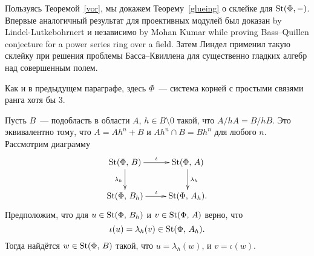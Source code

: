 \documentclass[oneside, 11pt]{amsart} \pdfoutput=1
\begin{document}
Пользуясь Теоремой~\ref{vor}, мы докажем Теорему~\ref{glueing} о склейке для $\mathop{\mathrm{St}}\nolimits(\Phi,-)$. Впервые аналогичный результат для проективных модулей был доказан by Lindel-Lutkebohrnert и независимо by Mohan Kumar while proving Bass--Quillen conjecture for a power series ring over a field. Затем Линдел применил такую склейку при решения проблемы Басса--Квиллена для существенно гладких алгебр над совершенным полем.

Как и в предыдущем параграфе, здесь $\Phi$~--- система корней с простыми связями ранга хотя бы 3.

\begin{theorem}
\label{glueing}
Пусть $B$~--- подобласть в области $A$, $h\in B\setminus0$ такой, что $A / hA = B / hB$. Это эквивалентно тому, что $A = Ah^n + B$ и $Ah^n \cap B = Bh^n$ для любого $n$. Рассмотрим диаграмму
$$
\xymatrix{
\St(\Phi,\,B)\ar[r]^{\iota}\ar[d]_{\lambda_h}&\St(\Phi,\,A)\ar[d]^{\lambda_h}\\
\St(\Phi,\,B_h)\ar[r]^{\iota}&\St(\Phi,\,A_h).
}
$$
Предположим, что для $u\in\mathop{\mathrm{St}}\nolimits(\Phi,\,B_h)$ и $v\in\mathop{\mathrm{St}}\nolimits(\Phi,\,A)$ верно, что $$\iota(u)=\lambda_h(v)\in\mathop{\mathrm{St}}\nolimits(\Phi,\,A_h).$$
Тогда найдётся $w\in\mathop{\mathrm{St}}\nolimits(\Phi,\,B)$ такой, что $u=\lambda_h(w)$, и $v=\iota(w)$.
\end{theorem}
\end{document}
